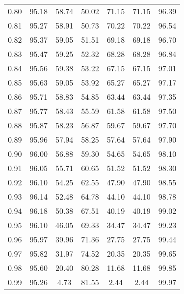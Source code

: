 \begin{tabular}{|c|c|c|c|c|c|c|}
      0.80 &     95.18 &     58.74 &      50.02 &   71.15 &      71.15 &         96.39 \\
      0.81 &     95.27 &     58.91 &      50.73 &   70.22 &      70.22 &         96.54 \\
      0.82 &     95.37 &     59.05 &      51.51 &   69.18 &      69.18 &         96.70 \\
      0.83 &     95.47 &     59.25 &      52.32 &   68.28 &      68.28 &         96.84 \\
      0.84 &     95.56 &     59.38 &      53.22 &   67.15 &      67.15 &         97.01 \\
      0.85 &     95.63 &     59.05 &      53.92 &   65.27 &      65.27 &         97.17 \\
      0.86 &     95.71 &     58.83 &      54.85 &   63.44 &      63.44 &         97.35 \\
      0.87 &     95.77 &     58.43 &      55.59 &   61.58 &      61.58 &         97.50 \\
      0.88 &     95.87 &     58.23 &      56.87 &   59.67 &      59.67 &         97.70 \\
      0.89 &     95.96 &     57.94 &      58.25 &   57.64 &      57.64 &         97.90 \\
      0.90 &     96.00 &     56.88 &      59.30 &   54.65 &      54.65 &         98.10 \\
      0.91 &     96.05 &     55.71 &      60.65 &   51.52 &      51.52 &         98.30 \\
      0.92 &     96.10 &     54.25 &      62.55 &   47.90 &      47.90 &         98.55 \\
      0.93 &     96.14 &     52.48 &      64.78 &   44.10 &      44.10 &         98.78 \\
      0.94 &     96.18 &     50.38 &      67.51 &   40.19 &      40.19 &         99.02 \\
      0.95 &     96.10 &     46.05 &      69.33 &   34.47 &      34.47 &         99.23 \\
      0.96 &     95.97 &     39.96 &      71.36 &   27.75 &      27.75 &         99.44 \\
      0.97 &     95.82 &     31.97 &      74.52 &   20.35 &      20.35 &         99.65 \\
      0.98 &     95.60 &     20.40 &      80.28 &   11.68 &      11.68 &         99.85 \\
      0.99 &     95.26 &      4.73 &      81.55 &    2.44 &       2.44 &         99.97 \\
\bottomrule
\end{tabular}
